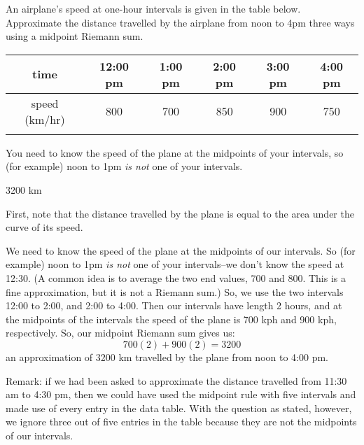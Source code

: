 \begin{question}\label{1.1airtime}
An airplane's speed at one-hour intervals is given in the table below.
Approximate the distance travelled by the airplane from noon to 4pm three ways using a midpoint Riemann sum.
\begin{center}
\renewcommand{\arraystretch}{1.3}
   \begin{tabular}{!{\vrule width 1pt}c!{\vrule width 1pt}c|c|c|c|c!{\vrule width 1pt}}
        time  & 12:00 pm & 1:00 pm & 2:00 pm & 3:00 pm & 4:00 pm   \\
         \hline
        speed (km/hr) & 800 & 700 & 850 &900 & 750 \\
     \end{tabular}
\renewcommand{\arraystretch}{1.0}
\end{center}

\end{question}
\begin{hint}
You need to know the speed of the plane at the midpoints of your intervals, so (for example) noon to 1pm \emph{is not} one of your intervals.
\end{hint}
\begin{answer}
3200 km
\end{answer}
\begin{solution}
First, note that the distance travelled by the plane is equal to the area under the curve of its speed.

We need to know the speed of the plane at the midpoints of our intervals. So (for example) noon to 1pm \emph{is not} one of your intervals--we don't know the speed at 12:30. (A common idea is to average the two end values, 700 and 800. This is a fine approximation, but it is not a Riemann sum.) So, we use the two intervals 12:00 to 2:00, and 2:00 to 4:00. Then our intervals have length 2 hours, and at the midpoints of the intervals the speed of the plane is 700 kph and 900 kph, respectively. So, our midpoint Riemann sum gives us:
\[700(2)+900(2) = 3200\]
an approximation of 3200 km travelled by the plane from noon to 4:00 pm.

Remark: if we had been asked to approximate the distance travelled from 11:30 am to 4:30 pm, then we could have used the midpoint rule with five intervals and made use of every entry in the data table. With the question as stated, however, we ignore three out of five entries in the table because they are not the midpoints of our intervals.
\end{solution}


